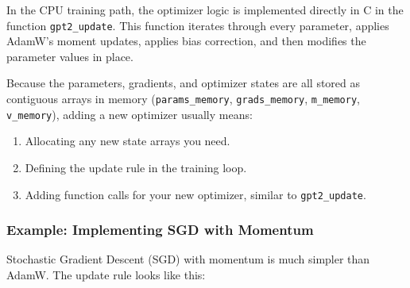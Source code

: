 \documentclass[
  letterpaper,
  DIV=11,
  numbers=noendperiod]{scrreprt}
\providecommand{\tightlist}{%
  \setlength{\itemsep}{0pt}\setlength{\parskip}{0pt}}
\begin{document}
In the CPU training path, the optimizer logic is implemented directly in
C in the function \texttt{gpt2\_update}. This function iterates through
every parameter, applies AdamW's moment updates, applies bias
correction, and then modifies the parameter values in place.

Because the parameters, gradients, and optimizer states are all stored
as contiguous arrays in memory (\texttt{params\_memory},
\texttt{grads\_memory}, \texttt{m\_memory}, \texttt{v\_memory}), adding
a new optimizer usually means:

\begin{enumerate}
\def\labelenumi{\arabic{enumi}.}
\tightlist
\item
  Allocating any new state arrays you need.
\item
  Defining the update rule in the training loop.
\item
  Adding function calls for your new optimizer, similar to
  \texttt{gpt2\_update}.
\end{enumerate}

\subsubsection{Example: Implementing SGD with
Momentum}\label{example-implementing-sgd-with-momentum}

Stochastic Gradient Descent (SGD) with momentum is much simpler than
AdamW. The update rule looks like this:
\end{document}
